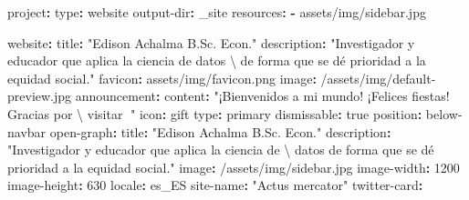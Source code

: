 \documentclass[
  doc,
  floatsintext,
  longtable,
  a4paper,
  nolmodern,
  notxfonts,
  notimes,
  12pt,
  colorlinks=true,linkcolor=blue,citecolor=blue,urlcolor=blue]{apa7}
\newenvironment{Shaded}{\begin{snugshade}}{\end{snugshade}}
\newcommand{\AttributeTok}[1]{\textcolor[rgb]{0.40,0.45,0.13}{#1}}
\newcommand{\CharTok}[1]{\textcolor[rgb]{0.13,0.47,0.30}{#1}}
\newcommand{\DecValTok}[1]{\textcolor[rgb]{0.68,0.00,0.00}{#1}}
\newcommand{\FunctionTok}[1]{\textcolor[rgb]{0.28,0.35,0.67}{#1}}
\newcommand{\KeywordTok}[1]{\textcolor[rgb]{0.00,0.23,0.31}{\textbf{#1}}}
\newcommand{\SpecialCharTok}[1]{\textcolor[rgb]{0.37,0.37,0.37}{#1}}
\newcommand{\StringTok}[1]{\textcolor[rgb]{0.13,0.47,0.30}{#1}}
\begin{document}
\begin{Shaded}
\begin{Highlighting}[]
\FunctionTok{project}\KeywordTok{:}
\AttributeTok{  }\FunctionTok{type}\KeywordTok{:}\AttributeTok{ website}
\AttributeTok{  }\FunctionTok{output{-}dir}\KeywordTok{:}\AttributeTok{ \_site}
\AttributeTok{  }\FunctionTok{resources}\KeywordTok{:}
\AttributeTok{    }\KeywordTok{{-}}\AttributeTok{ assets/img/sidebar.jpg}

\FunctionTok{website}\KeywordTok{:}
\AttributeTok{  }\FunctionTok{title}\KeywordTok{:}\AttributeTok{ }\StringTok{"Edison Achalma B.Sc. Econ."}
\AttributeTok{  }\FunctionTok{description}\KeywordTok{:}\AttributeTok{ }\StringTok{"Investigador y educador que aplica la ciencia de datos }\SpecialCharTok{\textbackslash{} }
\StringTok{  de forma que se dé prioridad a la equidad social."}
\AttributeTok{  }\FunctionTok{favicon}\KeywordTok{:}\AttributeTok{ assets/img/favicon.png }
\AttributeTok{  }\FunctionTok{image}\KeywordTok{:}\AttributeTok{ /assets/img/default{-}preview.jpg}
\AttributeTok{  }
\AttributeTok{  }\FunctionTok{announcement}\KeywordTok{:}
\AttributeTok{    }\FunctionTok{content}\KeywordTok{:}\AttributeTok{ }\StringTok{"¡Bienvenidos a mi mundo! ¡Felices fiestas! Gracias por  }\SpecialCharTok{\textbackslash{} }
\StringTok{    visitar 🎄"}
\AttributeTok{    }\FunctionTok{icon}\KeywordTok{:}\AttributeTok{ gift}
\AttributeTok{    }\FunctionTok{type}\KeywordTok{:}\AttributeTok{ primary}
\AttributeTok{    }\FunctionTok{dismissable}\KeywordTok{:}\AttributeTok{ }\CharTok{true}
\AttributeTok{    }\FunctionTok{position}\KeywordTok{:}\AttributeTok{ below{-}navbar}
\AttributeTok{  }
\AttributeTok{  }\FunctionTok{open{-}graph}\KeywordTok{:}
\AttributeTok{    }\FunctionTok{title}\KeywordTok{:}\AttributeTok{ }\StringTok{"Edison Achalma B.Sc. Econ."}
\AttributeTok{    }\FunctionTok{description}\KeywordTok{:}\AttributeTok{ }\StringTok{"Investigador y educador que aplica la ciencia de    }\SpecialCharTok{\textbackslash{} }
\StringTok{    datos de forma que se dé prioridad a la equidad social."}
\AttributeTok{    }\FunctionTok{image}\KeywordTok{:}\AttributeTok{ /assets/img/sidebar.jpg}
\AttributeTok{    }\FunctionTok{image{-}width}\KeywordTok{:}\AttributeTok{ }\DecValTok{1200}
\AttributeTok{    }\FunctionTok{image{-}height}\KeywordTok{:}\AttributeTok{ }\DecValTok{630}
\AttributeTok{    }\FunctionTok{locale}\KeywordTok{:}\AttributeTok{ es\_ES}
\AttributeTok{    }\FunctionTok{site{-}name}\KeywordTok{:}\AttributeTok{ }\StringTok{"Actus mercator"}
\AttributeTok{    }
\AttributeTok{  }\FunctionTok{twitter{-}card}\KeywordTok{:}

\end{Highlighting}
\end{Shaded}
\end{document}

